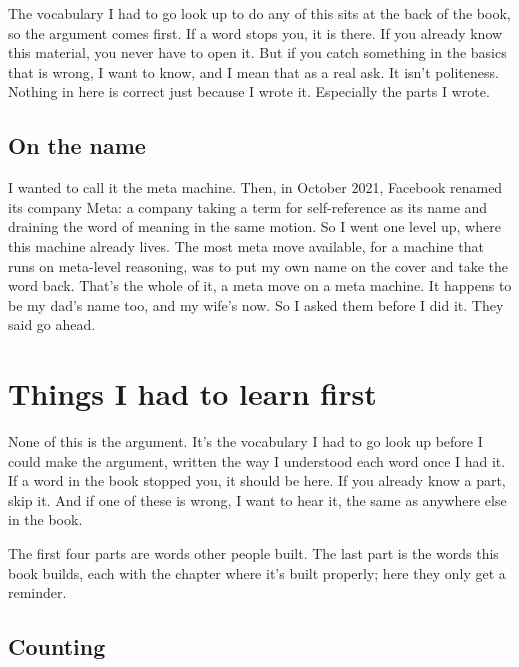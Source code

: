 \documentclass[11pt,twoside]{article}
\theoremstyle{thielethm}
\theoremstyle{thieledef}
\theoremstyle{thieledef}
\theoremstyle{thieledef}
\theoremstyle{thielethm}
\theoremstyle{thieleobs}
\theoremstyle{thielethm}
\begin{document}
The vocabulary I had to go look up to do any of this sits at the back of the book, so the argument comes first. If a word stops you, it is there. If you already know this material, you never have to open it. But if you catch something in the basics that is wrong, I want to know, and I mean that as a real ask. It isn't politeness. Nothing in here is correct just because I wrote it. Especially the parts I wrote.

\subsection*{On the name}

I wanted to call it the meta machine. Then, in October 2021, Facebook renamed its company Meta: a company taking a term for self-reference as its name and draining the word of meaning in the same motion. So I went one level up, where this machine already lives. The most meta move available, for a machine that runs on meta-level reasoning, was to put my own name on the cover and take the word back. That's the whole of it, a meta move on a meta machine. It happens to be my dad's name too, and my wife's now. So I asked them before I did it. They said go ahead.

\appendix
\section{Things I had to learn first}
\label{sec:vocab}

None of this is the argument. It's the vocabulary I had to go look up before I could make the argument, written the way I understood each word once I had it. If a word in the book stopped you, it should be here. If you already know a part, skip it. And if one of these is wrong, I want to hear it, the same as anywhere else in the book.

The first four parts are words other people built. The last part is the words this book builds, each with the chapter where it's built properly; here they only get a reminder.

\subsection{Counting}
\end{document}
